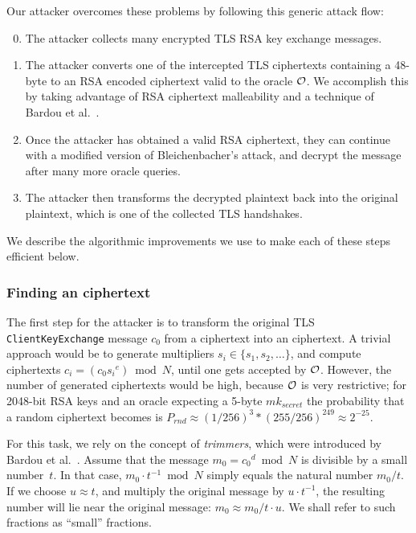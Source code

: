 Our attacker overcomes these problems by following this generic attack flow:
\begin{enumerate}
 \setcounter{enumi}{-1}
	\item The attacker collects many encrypted TLS RSA key exchange messages.
	\item The attacker converts one of the intercepted TLS ciphertexts containing a 48-byte \pms to an RSA \PKCS encoded ciphertext valid to the \ssltwo oracle $\mathcal{O}$. \ifext We accomplish this by taking advantage of RSA ciphertext malleability and a technique of Bardou et al.~\cite{bardou2012efficient}. \fi
	\item Once the attacker has obtained a valid \ssltwo RSA ciphertext, they can continue with a modified version of Bleichenbacher's attack, and decrypt the message after many more oracle queries.
	\item The attacker then transforms the decrypted plaintext back into the original plaintext, which is one of the collected TLS handshakes.
\end{enumerate}

We describe the algorithmic improvements we use to make each of these steps efficient below.

\subsubsection{Finding an \sslconform ciphertext}
\label{sec:trimmers}
The first step for the attacker is to transform the original TLS \texttt{ClientKeyExchange} message $c_0$ from a \tlsconform ciphertext into an \sslconform ciphertext. 
\ifext
A trivial approach would be to generate multipliers $s_i \in \{s_1,s_2,\ldots\}$, and compute ciphertexts $c_i = (c_0 {s_i}^e) \bmod N$, until one gets accepted by $\mathcal{O}$.
However, the number of generated ciphertexts would be high, because $\mathcal{O}$ is very restrictive; for 2048-bit RSA keys and an oracle expecting a 5-byte $mk_{secret}$ the probability that a random ciphertext becomes \sslconform is $P_{rnd} \approx (1/256)^3 * (255/256)^{249} \approx 2^{-25}$.
\fi

For this task, we rely on the concept of \emph{trimmers}, which were introduced by Bardou et al.~\cite{bardou2012efficient}. 
Assume that the message $m_{0} = {c_0}^d \bmod N$ is divisible by a small number~$t$. In that case,  $m_{0} \cdot t^{-1} \bmod{N}$ simply equals the natural number $m_{0} / t$. 
If we choose $u \approx t$, and multiply the original message by $u \cdot t^{-1}$, the resulting number will lie near the original message: $m_0 \approx m_0 / t \cdot u$.  \ifext We shall refer to such fractions as ``small'' fractions. \fi

